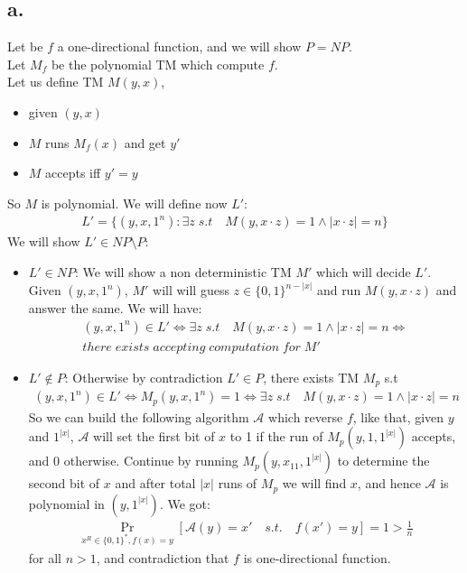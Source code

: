 \documentclass[11pt]{article}
\theoremstyle{plain}
\theoremstyle{nonumberplainnobrackets}
\begin{document}
\subsection*{a. }
Let be $f$ a one-directional function, and we will show $P=NP$.\\
Let $M_f$ be the polynomial TM which compute $f$.\\
Let us define TM $M(y,x)$, 
\begin{itemize}
\item given $(y,x)$
\item $M$ runs $M_f(x)$ and get $y'$
\item $M$ accepts iff $y'=y$
\end{itemize}
So $M$ is polynomial. We will define now $L'$:
\begin{align*}
L' = \{ (y,x,1^n) : \exists z \;s.t\quad M(y,x\cdot z)=1 \wedge |x\cdot z| =n \}
\end{align*}
We will show $L'\in NP\setminus P$:
\begin{itemize}
	\item $L'\in NP$: We will show a non deterministic TM $M'$ which will decide $L'$. Given $(y,x,1^n)$, $M'$ will will guess $z\in \{0,1\}^{n-|x|}$ and run $M(y,x\cdot z)$ and answer the same. We will have:
	\begin{align*}
	(y,x,1^n) \in L' \iff \exists z \;s.t\quad M(y,x\cdot z)=1 \wedge |x\cdot z| =n \iff \\ there \; exists\;accepting\; computation\; for\;M'
	\end{align*}
	\item $L'\notin P$: Otherwise by contradiction $L'\in P$, there exists TM $M_p$ s.t 
	\begin{align*}
	(y,x,1^n) \in L' \iff  M_p(y,x,1^n)=1 \iff  \exists z \;s.t\quad M(y,x\cdot z)=1 \wedge |x\cdot z| =n 
	\end{align*}
	So we can build the following algorithm $\mathcal{A}$ which reverse $f$, like that, given $y$ and $1^{|x|}$, $\mathcal{A}$ will set the first bit of $x$ to 1 if the run of $M_p(y,1,1^{|x|})$ accepts, and 0 otherwise. Continue by running $M_p(y,x_11,1^{|x|})$ to determine the second bit of $x$ and after total $|x|$ runs of $M_p$ we will find $x$, and hence $\mathcal{A}$ is polynomial in $(y,1^{|x|})$. We got:
		\begin{align*}
	\Pr_{x^R\in\{0,1\}^*,f(x)=y} [ \mathcal{A}(y)=x' \quad s.t.\quad f(x')=y]=1 >\frac{1}{n}
	\end{align*}
	for all $n>1$, and contradiction that $f$ is one-directional function.
\end{itemize}
\end{document}

